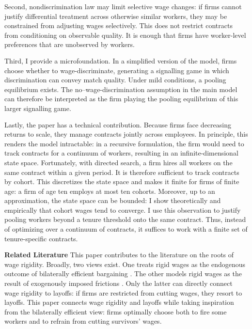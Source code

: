 Second, nondiscrimination law may limit selective wage changes: if firms cannot justify differential treatment across otherwise similar workers, they may be constrained from adjusting wages selectively. This does not restrict contracts from conditioning on observable quality. It is enough that firms have worker-level preferences that are unobserved by workers.

Third, I provide a microfoundation. In a simplified version of the model, firms choose whether to wage-discriminate, generating a signalling game in which discrimination can convey match quality. Under mild conditions, a pooling equilibrium exists. The no–wage-discrimination assumption in the main model can therefore be interpreted as the firm playing the pooling equilibrium of this larger signalling game.

Lastly, the paper has a technical contribution. Because firms face decreasing returns to scale, they manage contracts jointly across employees. In principle, this renders the model intractable: in a recursive formulation, the firm would need to track contracts for a continuum of workers, resulting in an infinite-dimensional state space. Fortunately, with directed search, a firm hires all workers on the same contract within a given period. It is therefore sufficient to track contracts by cohort. This discretizes the state space and makes it finite for firms of finite age: a firm of age ten employs at most ten cohorts. Moreover, up to an approximation, the state space can be bounded: I show theoretically and empirically that cohort wages tend to converge. I use this observation to justify pooling workers beyond a tenure threshold onto the same contract. Thus, instead of optimizing over a continuum of contracts, it suffices to work with a finite set of tenure-specific contracts.


\textbf{Related Literature}
This paper contributes to the literature on the roots of wage rigidity. Broadly, two views exist. One treats rigid wages as the endogenous outcome of bilaterally efficient bargaining \parencite{barro1977,thomas1988,balke2022,elsby2024}. The other models rigid wages as the result of exogenously imposed frictions \parencite{christiano2005,nekarda2020,blanco2025}. Only the latter can directly connect wage rigidity to layoffs: if firms are restricted from cutting wages, they resort to layoffs. This paper connects wage rigidity and layoffs while taking inspiration from the bilaterally efficient view: firms optimally choose both to fire some workers and to refrain from cutting survivors’ wages.

